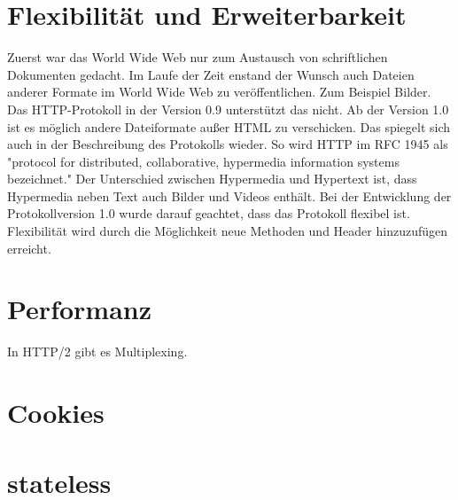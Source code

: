 \documentclass{llncs}
\begin{document}
\section{Flexibilität und Erweiterbarkeit}
Zuerst war das World Wide Web nur zum Austausch von schriftlichen Dokumenten gedacht. Im Laufe der Zeit enstand der Wunsch auch Dateien anderer Formate im World Wide Web zu veröffentlichen. Zum Beispiel Bilder. Das HTTP-Protokoll in der Version 0.9 unterstützt das nicht. Ab der Version 1.0 ist es möglich andere Dateiformate außer HTML zu verschicken. Das spiegelt sich auch in der Beschreibung des Protokolls wieder. So wird HTTP im RFC 1945 als "protocol for distributed, collaborative, hypermedia information systems bezeichnet." Der Unterschied zwischen Hypermedia und Hypertext ist, dass Hypermedia neben Text auch Bilder und Videos enthält.
Bei der Entwicklung der Protokollversion 1.0 wurde darauf geachtet, dass das Protokoll flexibel ist. Flexibilität wird durch die Möglichkeit neue Methoden und Header hinzuzufügen erreicht. 
\section{Performanz}
In HTTP/2 gibt es Multiplexing.\cite{Belshe2015}
\section{Cookies}
\section{stateless}


\end{document}

